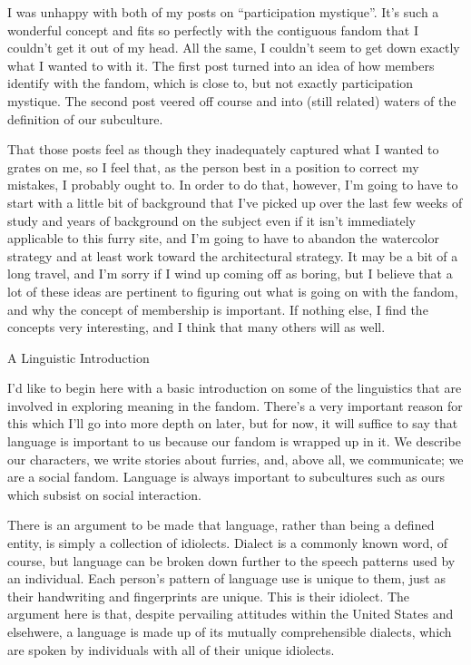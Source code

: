 I was unhappy with both of my posts on ``participation mystique''. It's such a wonderful concept and fits so perfectly with the contiguous fandom that I couldn't get it out of my head. All the same, I couldn't seem to get down exactly what I wanted to with it. The first post turned into an idea of how members identify with the fandom, which is close to, but not exactly participation mystique. The second post veered off course and into (still related) waters of the definition of our subculture.

That those posts feel as though they inadequately captured what I wanted to grates on me, so I feel that, as the person best in a position to correct my mistakes, I probably ought to. In order to do that, however, I'm going to have to start with a little bit of background that I've picked up over the last few weeks of study and years of background on the subject even if it isn't immediately applicable to this furry site, and I'm going to have to abandon the watercolor strategy and at least work toward the architectural strategy. It may be a bit of a long travel, and I'm sorry if I wind up coming off as boring, but I believe that a lot of these ideas are pertinent to figuring out what is going on with the fandom, and why the concept of membership is important. If nothing else, I find the concepts very interesting, and I think that many others will as well.

A Linguistic Introduction

I'd like to begin here with a basic introduction on some of the linguistics that are involved in exploring meaning in the fandom. There's a very important reason for this which I'll go into more depth on later, but for now, it will suffice to say that language is important to us because our fandom is wrapped up in it. We describe our characters, we write stories about furries, and, above all, we communicate; we are a social fandom. Language is always important to subcultures such as ours which subsist on social interaction.

There is an argument to be made that language, rather than being a defined entity, is simply a collection of idiolects. Dialect is a commonly known word, of course, but language can be broken down further to the speech patterns used by an individual. Each person's pattern of language use is unique to them, just as their handwriting and fingerprints are unique. This is their idiolect. The argument here is that, despite pervailing attitudes within the United States and elsehwere, a language is made up of its mutually comprehensible dialects, which are spoken by individuals with all of their unique idiolects.

